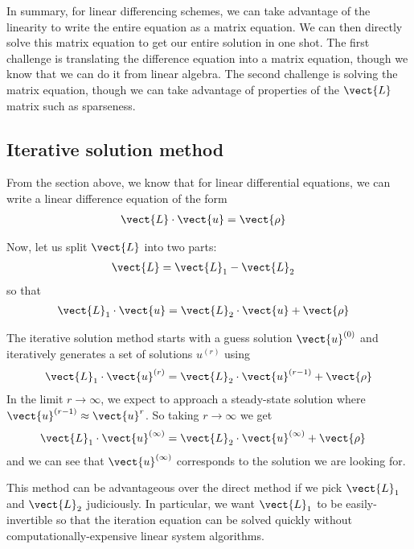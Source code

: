 \documentclass[twocolumn]{myarticle}
\begin{document}
In summary, for linear differencing schemes, we can take advantage of the linearity to write the entire equation as a matrix equation.
We can then directly solve this matrix equation to get our entire solution in one shot.
The first challenge is translating the difference equation into a matrix equation, though we know that we can do it from linear algebra.
The second challenge is solving the matrix equation, though we can take advantage of properties of the $ \vect{L} $ matrix such as sparseness.

\subsection{Iterative solution method}
\label{subsec:iterative_solution_method}

From the section above, we know that for linear differential equations, we can write a linear difference equation of the form
\begin{align}
    \vect{L} \cdot \vect{u} &= \vect{\rho}
\end{align}

Now, let us split $ \vect{L} $ into two parts:
\begin{align}
    \vect{L} &= \vect{L}_1 - \vect{L}_2
\end{align}
so that
\begin{align}
    \vect{L}_1 \cdot \vect{u} &= \vect{L}_2 \cdot \vect{u} + \vect{\rho}
\end{align}

The iterative solution method starts with a guess solution $ \vect{u}^{(0)} $ and iteratively generates a set of solutions $ u^{(r)} $ using
\begin{align}
    \vect{L}_1 \cdot \vect{u}^{(r)} = \vect{L}_2 \cdot \vect{u}^{(r-1)} + \vect{\rho}
\end{align}
In the limit $ r \to \infty $, we expect to approach a steady-state solution where $ \vect{u}^{(r-1)} \approx \vect{u}^{r} $.
So taking $ r \to \infty $ we get
\begin{align}
    \vect{L}_1 \cdot \vect{u}^{(\infty)} &= \vect{L}_2 \cdot \vect{u}^{(\infty)} + \vect{\rho}
\end{align}
and we can see that $ \vect{u}^{(\infty)} $ corresponds to the solution we are looking for.

This method can be advantageous over the direct method if we pick $ \vect{L}_1 $ and $ \vect{L}_2 $ judiciously.
In particular, we want $ \vect{L}_1 $ to be easily-invertible so that the iteration equation can be solved quickly without computationally-expensive linear system algorithms.
\end{document}
